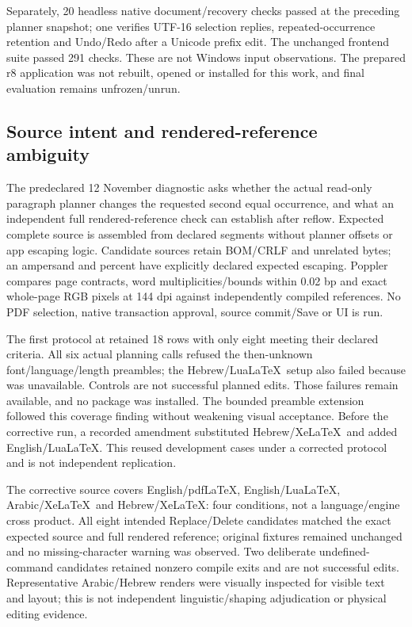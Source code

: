 Separately, 20 headless native document/recovery checks passed at the preceding
planner snapshot; one verifies UTF-16 selection replies, repeated-occurrence
retention and Undo/Redo after a Unicode prefix edit. The unchanged frontend
suite passed 291 checks. These are not Windows input observations. The prepared
r8 application was not rebuilt, opened or installed for this work, and final
evaluation remains unfrozen/unrun.

\subsection{Source intent and rendered-reference ambiguity}
\label{sec:occurrence-reference}
The predeclared 12 November diagnostic asks whether the actual read-only
paragraph planner changes the requested second equal occurrence, and what an
independent full rendered-reference check can establish after reflow. Expected
complete source is assembled from declared segments without planner offsets
or app escaping logic. Candidate sources retain BOM/CRLF and unrelated bytes;
an ampersand and percent have explicitly declared expected escaping. Poppler
compares page contracts, word multiplicities/bounds within 0.02 bp and exact
whole-page RGB pixels at 144 dpi against independently compiled references.
No PDF selection, native transaction approval, source commit/Save or UI is run.

The first protocol at  retained 18 rows with only eight meeting
their declared criteria. All six actual planning calls refused the then-unknown
font/language/length preambles; the Hebrew/Lua\LaTeX\ setup also failed because
 was unavailable. Controls are not successful planned
edits. Those failures remain available, and no package was installed. The
bounded preamble extension followed this coverage finding without weakening
visual acceptance. Before the corrective run, a recorded amendment substituted
Hebrew/Xe\LaTeX\ and added English/Lua\LaTeX. This reused development cases
under a corrected protocol and is not independent replication.

The corrective source  covers English/pdf\LaTeX,
English/Lua\LaTeX, Arabic/Xe\LaTeX\ and Hebrew/Xe\LaTeX: four conditions,
not a language/engine cross product. All eight intended Replace/Delete
candidates matched the exact expected source and full rendered reference;
original fixtures remained unchanged and no missing-character warning was
observed. Two deliberate undefined-command candidates retained nonzero compile
exits and are not successful edits. Representative Arabic/Hebrew renders were
visually inspected for visible text and layout; this is not independent
linguistic/shaping adjudication or physical editing evidence.

